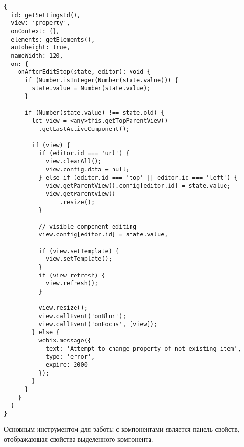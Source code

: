 \begin{lstlisting}
{
  id: getSettingsId(),
  view: 'property',
  onContext: {},
  elements: getElements(),
  autoheight: true,
  nameWidth: 120,
  on: {
    onAfterEditStop(state, editor): void {
      if (Number.isInteger(Number(state.value))) {
        state.value = Number(state.value);
      }

      if (Number(state.value) !== state.old) {
        let view = <any>this.getTopParentView()
          .getLastActiveComponent();

        if (view) {
          if (editor.id === 'url') {
            view.clearAll();
            view.config.data = null;
          } else if (editor.id === 'top' || editor.id === 'left') {
            view.getParentView().config[editor.id] = state.value;
            view.getParentView()
                .resize();
          }

          // visible component editing
          view.config[editor.id] = state.value;

          if (view.setTemplate) {
            view.setTemplate();
          }
          if (view.refresh) {
            view.refresh();
          }

          view.resize();
          view.callEvent('onBlur');
          view.callEvent('onFocus', [view]);
        } else {
          webix.message({
            text: 'Attempt to change property of not existing item',
            type: 'error',
            expire: 2000
          });
        }
      }
    }
  }
}
\end{lstlisting}

Основным инструментом для работы с компонентами является панель свойств, отображающая свойства выделенного компонента.

